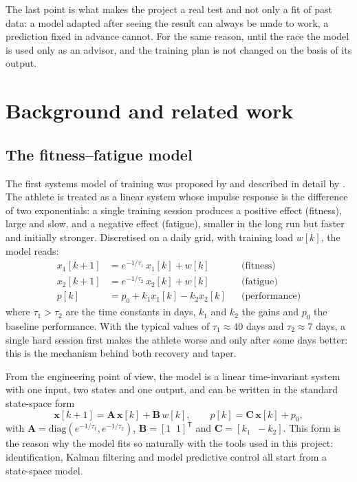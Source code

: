 The last point is what makes the project a real test and not only a fit of
past data: a model adapted after seeing the result can always be made to work,
a prediction fixed in advance cannot. For the same reason, until the race the
model is used only as an advisor, and the training plan is not changed on the
basis of its output.

\section{Background and related work}\label{sec:background}

\subsection{The fitness--fatigue model}
The first systems model of training was proposed by \citet{banister1975} and
described in detail by \citet{calvert1976}. The athlete is treated as a linear
system whose impulse response is the difference of two exponentials: a single
training session produces a positive effect (fitness), large and slow, and a
negative effect (fatigue), smaller in the long run but faster and initially
stronger. Discretised on a daily grid, with training load $w[k]$, the model
reads:
\begin{align}
x_1[k+1] &= e^{-1/\tau_1}\, x_1[k] + w[k] && \text{(fitness)}\label{eq:x1}\\
x_2[k+1] &= e^{-1/\tau_2}\, x_2[k] + w[k] && \text{(fatigue)}\label{eq:x2}\\
p[k]     &= p_0 + k_1 x_1[k] - k_2 x_2[k]  && \text{(performance)}\label{eq:p}
\end{align}
where $\tau_1 > \tau_2$ are the time constants in days, $k_1$ and $k_2$ the
gains and $p_0$ the baseline performance. With the typical values of
$\tau_1 \approx 40$ days and $\tau_2 \approx 7$ days, a single hard session
first makes the athlete worse and only after some days better: this is the
mechanism behind both recovery and taper.

From the engineering point of view, the model is a linear time-invariant
system with one input, two states and one output, and can be written in the
standard state-space form
\begin{equation}
\mathbf{x}[k+1] = \mathbf{A}\,\mathbf{x}[k] + \mathbf{B}\,w[k], \qquad
p[k] = \mathbf{C}\,\mathbf{x}[k] + p_0,
\label{eq:ss}
\end{equation}
with $\mathbf{A} = \mathrm{diag}(e^{-1/\tau_1}, e^{-1/\tau_2})$,
$\mathbf{B} = [1\;\;1]^{\mathsf T}$ and $\mathbf{C} = [k_1\;\;-k_2]$.
This form is the reason why the model fits so naturally with the tools used in
this project: identification, Kalman filtering and model predictive control
all start from a state-space model.

